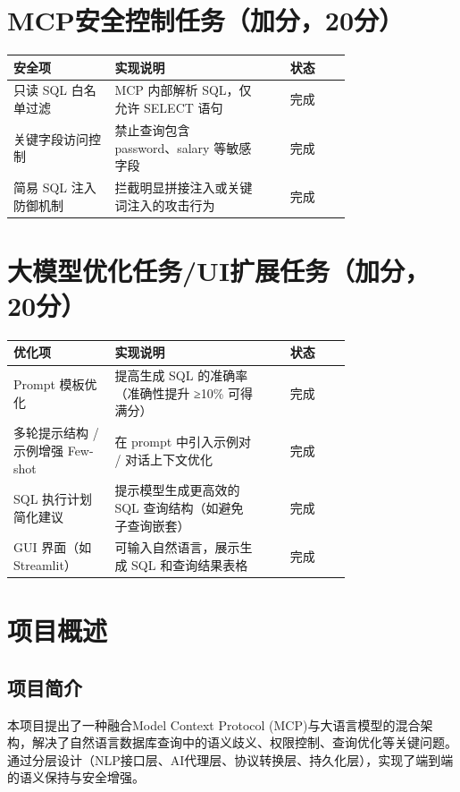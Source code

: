 \documentclass{article}
\begin{document}
	\section*{MCP安全控制任务（加分，20分）}
	
	\begin{tabular}{|p{0.3\linewidth}|p{0.45\linewidth}|c|}
		\hline
		安全项 & 实现说明 & 状态 \\ \hline
		只读 SQL 白名单过滤 & MCP 内部解析 SQL，仅允许 SELECT 语句 & 完成 \\ \hline
		关键字段访问控制 & 禁止查询包含 password、salary 等敏感字段 & 完成 \\ \hline
		简易 SQL 注入防御机制 & 拦截明显拼接注入或关键词注入的攻击行为 & 完成 \\ \hline
	\end{tabular}
	
	\section*{大模型优化任务/UI扩展任务（加分，20分）}
	
	\begin{tabular}{|p{0.3\linewidth}|p{0.45\linewidth}|c|}
		\hline
		\textbf{优化项} & \textbf{实现说明} & \textbf{状态} \\ \hline
		Prompt 模板优化 & 提高生成 SQL 的准确率（准确性提升 ≥10\% 可得满分） & 完成 \\ \hline
		多轮提示结构 / 示例增强 Few-shot & 在 prompt 中引入示例对 / 对话上下文优化 & 完成 \\ \hline
		SQL 执行计划简化建议 & 提示模型生成更高效的 SQL 查询结构（如避免子查询嵌套） & 完成 \\ \hline
		GUI 界面（如 Streamlit） & 可输入自然语言，展示生成 SQL 和查询结果表格 & 完成 \\ \hline
	\end{tabular}
	
	\section{项目概述}
	
	\subsection{项目简介}
	
	本项目提出了一种融合Model Context Protocol (MCP)与大语言模型的混合架构，解决了自然语言数据库查询中的语义歧义、权限控制、查询优化等关键问题。通过分层设计（NLP接口层、AI代理层、协议转换层、持久化层），实现了端到端的语义保持与安全增强。
	
\end{document}
